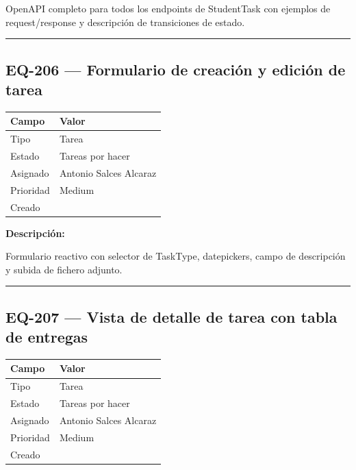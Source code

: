 \documentclass[
  spanish,
  11pt,
]{report}
\newcounter{none} %
\begin{document}
OpenAPI completo para todos los endpoints de StudentTask con ejemplos de
request/response y descripción de transiciones de estado.

\begin{center}\rule{0.5\linewidth}{0.5pt}\end{center}

\subsection{EQ-206 --- Formulario de creación y edición de
tarea}\label{eq-206-formulario-de-creaciuxf3n-y-ediciuxf3n-de-tarea}

{\def\LTcaptype{none} %
\begin{longtable}[]{@{}ll@{}}
\toprule\noalign{}
Campo & Valor \\
\midrule\noalign{}
\endhead
\bottomrule\noalign{}
\endlastfoot
Tipo & Tarea \\
Estado & Tareas por hacer \\
Asignado & Antonio Salces Alcaraz \\
Prioridad & Medium \\
Creado & \\
\end{longtable}
}

\textbf{Descripción:}

Formulario reactivo con selector de TaskType, datepickers, campo de
descripción y subida de fichero adjunto.

\begin{center}\rule{0.5\linewidth}{0.5pt}\end{center}

\subsection{EQ-207 --- Vista de detalle de tarea con tabla de
entregas}\label{eq-207-vista-de-detalle-de-tarea-con-tabla-de-entregas}

{\def\LTcaptype{none} %
\begin{longtable}[]{@{}ll@{}}
\toprule\noalign{}
Campo & Valor \\
\midrule\noalign{}
\endhead
\bottomrule\noalign{}
\endlastfoot
Tipo & Tarea \\
Estado & Tareas por hacer \\
Asignado & Antonio Salces Alcaraz \\
Prioridad & Medium \\
Creado & \\
\end{longtable}
}
\end{document}

